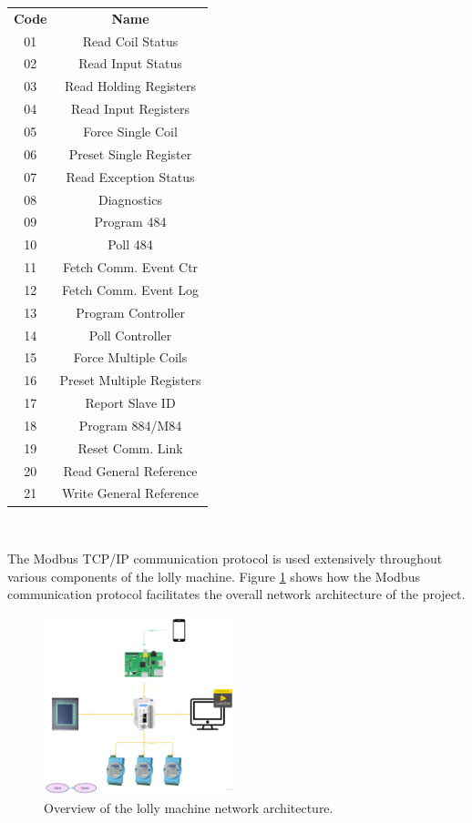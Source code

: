     \begin{center}
        \begin{tabular}{ c c }
         \textbf{Code} & \textbf{Name}\\ 
            01 & Read Coil Status\\
            02 & Read Input Status\\
            03 & Read Holding Registers\\
            04 & Read Input Registers\\
            05 & Force Single Coil\\
            06 & Preset Single Register\\
            07 & Read Exception Status\\
            08 & Diagnostics\\
            09 & Program 484\\
            10 & Poll 484\\
            11 & Fetch Comm. Event Ctr\\
            12 & Fetch Comm. Event Log\\
            13 & Program Controller\\
            14 & Poll Controller\\
            15 & Force Multiple Coils\\
            16 & Preset Multiple Registers\\
            17 & Report Slave ID\\
            18 & Program 884/M84\\
            19 & Reset Comm. Link\\
            20 & Read General Reference\\
            21 & Write General Reference\\
        \end{tabular}\\
    \end{center}

The Modbus TCP/IP communication protocol is used extensively throughout various components of the lolly machine. Figure \ref{fig:overView} shows how the Modbus communication protocol facilitates the overall network architecture of the project.

        \begin{figure}[H]
            \centering
            \includegraphics[width = 0.5\textwidth]{2_images/overView.jpg}
            \caption{Overview of the lolly machine network architecture.}
            \label{fig:overView}
        \end{figure}         